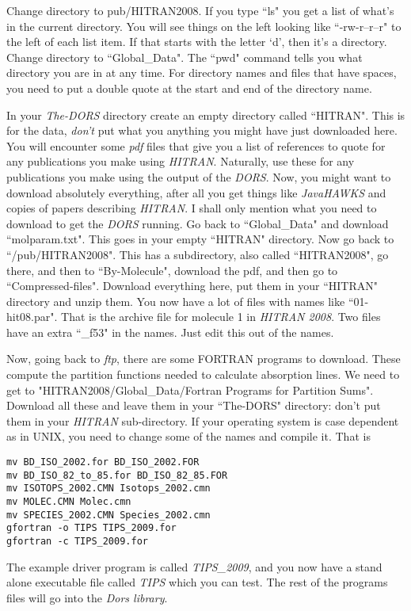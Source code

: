 \documentclass[12pt]{article}
\begin{document}
Change directory to pub/HITRAN2008. If you type ``ls" you get a list of what's in the
current directory.  You will see things on the left looking like ``-rw-r--r--r" to the left of each list
item. If that starts with the letter `d', then it's a directory. Change directory to
``Global\_Data".
The ``pwd" command tells you what directory you are in at any time.
 For directory names and files that have spaces, you need to put a double quote at the start and end of
the directory name. 

In your {\it The-DORS} directory create an empty directory called ``HITRAN". This is for the data, {\it don't} put 
what you anything you might have  just downloaded here. You will encounter  some {\it pdf} files that
 give you a list of references to quote
for any publications you make using {\it HITRAN}. Naturally, use these for any publications you make
using the output of the {\it DORS}. Now, you might want to download absolutely everything, after all you get
things like {\it JavaHAWKS} and copies of papers describing {\it HITRAN}. I shall only mention what you need
to download to get the {\it DORS} running. Go back to ``Global\_Data" and download ``molparam.txt".
This goes in your empty ``HITRAN" directory.  Now go back to ``/pub/HITRAN2008". This has a subdirectory,
also called ``HITRAN2008", go there, and then to ``By-Molecule", download the pdf, and then
go to ``Compressed-files". Download everything here, put them in your ``HITRAN" directory and
unzip them. You now have a lot of files with names like ``01-hit08.par". That is the archive file
for molecule 1 in {\it HITRAN 2008}. Two files have an extra ``\_f53"
in the names. Just edit this out of the names.

Now, going back to {\it ftp}, there are some FORTRAN programs to download. These compute the
partition functions needed to calculate absorption lines.
We need to get to "HITRAN2008/Global\_Data/Fortran Programs for Partition Sums".
Download all these and leave them in your ``The-DORS" directory: don't put them in your {\it HITRAN}
sub-directory.
 If your operating 
system is case dependent as in UNIX, you need to change some of the names and compile it. That is
\begin{verbatim}
mv BD_ISO_2002.for BD_ISO_2002.FOR
mv BD_ISO_82_to_85.for BD_ISO_82_85.FOR
mv ISOTOPS_2002.CMN Isotops_2002.cmn
mv MOLEC.CMN Molec.cmn
mv SPECIES_2002.CMN Species_2002.cmn
gfortran -o TIPS TIPS_2009.for
gfortran -c TIPS_2009.for
\end{verbatim}
The example driver program is called {\it TIPS\_2009}, and you now have a stand alone executable file called {\it TIPS} which you can test. The rest of the 
programs files will go into the {\it Dors library}.
\end{document}
